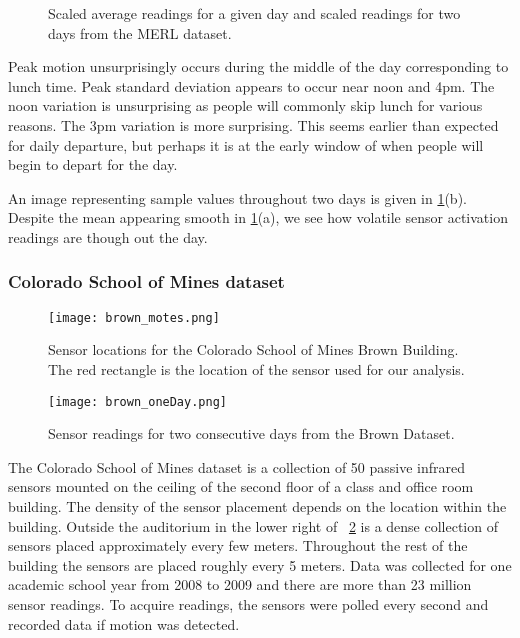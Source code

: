 \begin{figure}[!ht]
	\begin{center}
	\end{center}
	\caption{Scaled average readings for a given day and scaled readings for two days from the MERL dataset.}
	\label{fig:merl_scaled}
\end{figure}

Peak motion unsurprisingly occurs during the middle of the day corresponding to lunch time.  Peak standard deviation appears to occur near noon and 4pm.  The noon variation is unsurprising as people will commonly skip lunch for various reasons.  The 3pm variation is more surprising.  This seems earlier than expected for daily departure, but perhaps it is at the early window of when people will begin to depart for the day.  

An image representing sample values throughout two days is given in \ref{fig:merl_scaled}(b).  Despite the mean appearing smooth in \ref{fig:merl_scaled}(a), we see how volatile sensor activation readings are though out the day.


\subsubsection{Colorado School of Mines dataset}

\begin{figure}[t!]
	\begin{center}
		\texttt{[image: brown\_motes.png]}
	\end{center}
	\caption{Sensor locations for the Colorado School of Mines Brown Building.  The red rectangle is the location of the sensor used for our analysis.}
	\label{fig:csmbbfloor}
\end{figure}

\begin{figure}[!h]
	\begin{center}
		\texttt{[image: brown\_oneDay.png]}
	\end{center}
	\caption{Sensor readings for two consecutive days from the Brown Dataset.}
	\label{fig:csmbbsensor}
\end{figure}

The Colorado School of Mines dataset \cite{Hoff2009, Howard2013} is a collection of 50 passive infrared sensors mounted on the ceiling of the second floor of a class and office room building.  The density of the sensor placement depends on the location within the building.  Outside the auditorium in the lower right of ~\ref{fig:csmbbfloor} is a dense collection of sensors placed approximately every few meters.  Throughout the rest of the building the sensors are placed roughly every 5 meters.  Data was collected for one academic school year from 2008 to 2009 and there are more than 23 million sensor readings.  To acquire readings, the sensors were polled every second and recorded data if motion was detected.  

